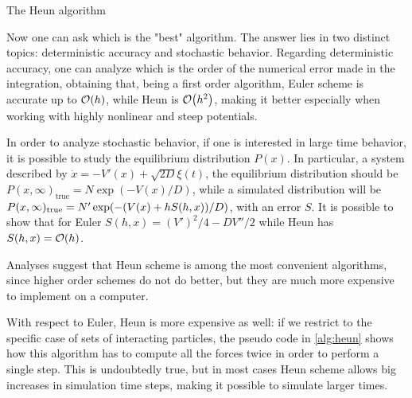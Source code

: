 \documentclass[../../master_thesis_np.tex]{subfiles}
\begin{document}
		\begin{algorithm}
			\caption{The Heun algorithm} \label{alg:heun}	
			\begin{algorithmic}[1]
				\EndFor
				\EndFor
			\end{algorithmic}
		\end{algorithm}
		Now one can ask which is the "best" algorithm. 
		The answer lies in two distinct topics: deterministic accuracy and stochastic behavior. 
		Regarding deterministic accuracy, one can analyze which is the order of the numerical error made in the integration, obtaining that, being a first order algorithm, Euler scheme is accurate up to $\order{h}$, while Heun is $\order{h^2}$, making it better especially when working with highly nonlinear and steep potentials.
		
		In order to analyze stochastic behavior, if one is interested in large time behavior, it is possible to study the equilibrium distribution $P(x)$. 
		In particular, a system described by $\dot{x} = -V'(x) + \sqrt{2D}\xi(t)$, the equilibrium distribution should be $P(x, \infty)_{\text{true}} = N \exp(-V(x)/D)$, while a simulated distribution will be $P(x, \infty)_{\text{true}} = N' \exp(-\qty(V(x) + hS(h,x))/D)$, with an error $S$. It is possible to show \cite{mannella_integration_2011} that for Euler $S(h,x) = (V')^2/4 - DV''/2$ while Heun has $S(h,x) = \order{h}$.
		
		Analyses suggest that Heun scheme is among the most convenient algorithms, since higher order schemes do not do better, but they are much more expensive to implement on a computer. 
		
		With respect to Euler, Heun is more expensive as well: if we restrict to the specific case of sets of interacting particles, the pseudo code in \ref{alg:heun} shows how this algorithm has to compute all the forces twice in order to perform a single step. 
		This is undoubtedly true, but in most cases Heun scheme allows big increases in simulation time steps, making it possible to simulate larger times.		
		
\end{document}
